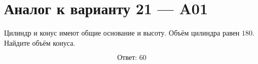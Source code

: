 \documentclass[12pt,a4paper]{article}
\begin{document}
\section*{Аналог к варианту 21 — A01}

Цилиндр и конус имеют общие основание и высоту. Объём цилиндра равен \(180\). Найдите объём конуса.

\begin{center}
\end{center}

\[
\boxed{\text{Ответ: }60}
\]
\end{document}

